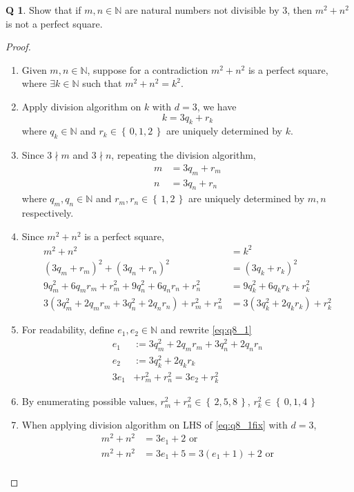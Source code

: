 \documentclass[12pt]{article}
\newcommand{\set}[1]{\left\{\,#1\,\right\}}
\theoremstyle{definition}
\newtheorem{qn}{Q}
\numberwithin{equation}{qn}
\newcommand{\nat}{\mathbb{N}}
\newenvironment{prf}
{
    \begin{proof}
        \hfill
        \begin{enumerate}[label*=\arabic*.]
                }
                {
                \hfill\qedsymbol
        \end{enumerate}
    \renewcommand{\qedsymbol}{}
    \end{proof}
}
\begin{document}
\newpage
\begin{qn}
    Show that if $m,n\in\nat$ are natural numbers not divisible by $3$, then $m^2 + n^2$ is not a perfect square.
\end{qn}
\begin{prf}
\item Given $m,n\in\nat$, suppose for a contradiction $m^2 + n^2$ is a perfect square,
    where $\exists k\in\nat$ such that $m^2 + n^2 = k^2$.
\item Apply division algorithm on $k$ with $d = 3$, we have
    $$k = 3q_k + r_k$$
    where $q_k\in\nat$ and $r_k\in\set{0,1,2}$ are uniquely determined by $k$.
\item Since $3\nmid m$ and $3\nmid n$, repeating the division algorithm,
    \begin{align*}
        m &= 3q_m + r_m  \\
        n &= 3q_n + r_n
    \end{align*}
    where $q_m, q_n\in\nat$ and $r_m,r_n\in\set{1,2}$ are uniquely determined by $m,n$ respectively.
\item Since $m^2 + n^2$ is a perfect square,
    \begin{align}
        m^2 + n^2 &= k^2 \\
        (3q_m + r_m)^2 + (3q_n + r_n)^2 &= (3q_k + r_k)^2    \\
        9q_m^2 + 6q_mr_m + r_m^2 + 9q_n^2 + 6q_nr_n + r_n^2 &= 9q_k^2 + 6q_kr_k + r_k^2 \\
        3(3q_m^2 + 2q_mr_m + 3q_n^2 + 2q_nr_n) + r_m^2 + r_n^2 &= 3(3q_k^2 + 2q_kr_k) + r_k^2   \label{eq:q8_1}
    \end{align}
\item For readability, define $e_1, e_2\in\nat$ and rewrite \eqref{eq:q8_1}
    \begin{align}
        e_1 &:= 3q_m^2 + 2q_mr_m + 3q_n^2 + 2q_nr_n  \\
        e_2 &:= 3q_k^2 + 2q_kr_k    \\
        3e_1 &+ r_m^2 + r_n^2 = 3e_2 + r_k^2    \label{eq:q8_1fix}
    \end{align}
\item By enumerating possible values, $r_m^2 + r_n^2 \in \set{2,5,8}$, $r_k^2 \in\set{0,1,4}$
\item When applying division algorithm on LHS of \eqref{eq:q8_1fix} with $d=3$,
    \begin{align*}
        m^2 + n^2 &= 3e_1 + 2 \text{ or}\\
        m^2 + n^2 &= 3e_1 + 5 = 3(e_1 + 1) + 2 \text{ or}\\

\end{align*}
\end{prf}
\end{document}

